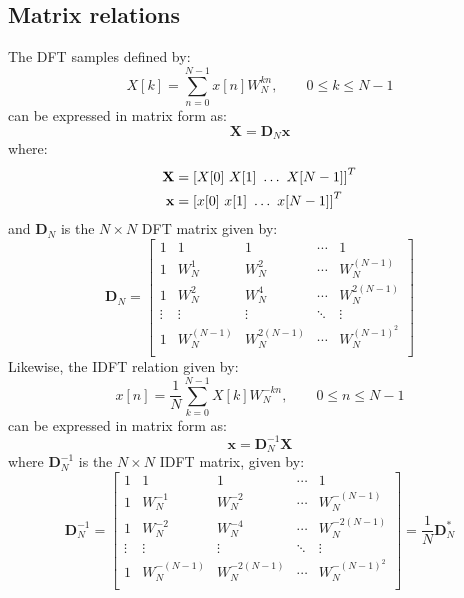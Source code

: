 \documentclass[../../main/main.tex]{subfiles}
\begin{document}
\subsection{Matrix relations}
The DFT samples defined by:
\begin{equation}
    X[k]
    =
    \sum_{n=0}^{N-1} x[n] W_{N}^{kn},
    \qquad
    0 \le k \le N-1
    \label{eq:L12_S16_1}
\end{equation}
can be expressed in matrix form as:
\begin{equation}
    \mathbf{X}
    =
    \mathbf{D}_{N} \mathbf{x}
    \label{eq:L12_S16_2}
\end{equation}
where:
\begin{align}
    \mathbf{X} &= \qty[X[0] \ X[1] \ \dots \ X[N-1]]^{T}    \\
    \mathbf{x} &= \qty[x[0] \ x[1] \ \dots \ x[N-1]]^{T}
\end{align}
and \( \mathbf{D}_{N} \) is the \( N \times N \) DFT matrix given by:
\begin{equation}
    \mathbf{D}_{N}
    =
    \begin{bmatrix}
        1   &   1   &   1   &   \cdots & 1   \\
        1   &   W_{N}^{1}   &   W_{N}^{2}   &   \cdots & W_{N}^{(N-1)}   \\
        1   &   W_{N}^{2}   &   W_{N}^{4}   &   \cdots & W_{N}^{2(N-1)}   \\
        \vdots  &   \vdots  &   \vdots  &   \ddots  &   \vdots  \\
        1   &   W_{N}^{(N-1)}   &   W_{N}^{2(N-1)}   &   \cdots & W_{N}^{(N-1)^2}   \\
    \end{bmatrix}
    \label{eq:L12_S17_1}
\end{equation}
Likewise, the IDFT relation given by:
\begin{equation}
    x[n]
    =
    \frac{1}{N} \sum_{k=0}^{N-1} X[k] W_{N}^{-kn},
    \qquad
    0 \le n \le N-1
    \label{eq:L12_S18_1}
\end{equation}
can be expressed in matrix form as:
\begin{equation}
    \mathbf{x}
    =
    \mathbf{D}_{N}^{-1} \mathbf{X}
    \label{eq:L12_S18_2}
\end{equation}
where \( \mathbf{D}_{N}^{-1} \) is the \( N \times N \) IDFT matrix, given by:
\begin{equation}
    \mathbf{D}_{N}^{-1}
    =
    \begin{bmatrix}
        1   &   1   &   1   &   \cdots & 1   \\
        1   &   W_{N}^{-1}   &   W_{N}^{-2}   &   \cdots & W_{N}^{-(N-1)}   \\
        1   &   W_{N}^{-2}   &   W_{N}^{-4}   &   \cdots & W_{N}^{-2(N-1)}   \\
        \vdots  &   \vdots  &   \vdots  &   \ddots  &   \vdots  \\
        1   &   W_{N}^{-(N-1)}   &   W_{N}^{-2(N-1)}   &   \cdots & W_{N}^{-(N-1)^2}   \\
    \end{bmatrix}
    =
    \frac{1}{N} \mathbf{D}_{N}^{*}
    \label{eq:L12_S19_1}
\end{equation}
\end{document}
